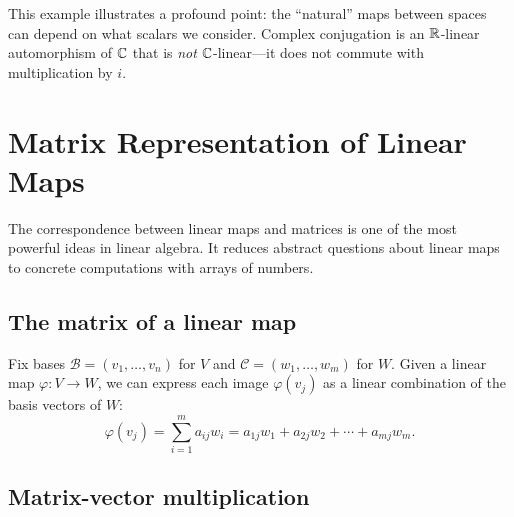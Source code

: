 \documentclass{report}
\begin{document}
This example illustrates a profound point: the ``natural'' maps between spaces can depend on what scalars we consider. Complex conjugation is an \(\RR\)-linear automorphism of \(\CC\) that is \emph{not} \(\CC\)-linear---it does not commute with multiplication by \(i\).



\section{Matrix Representation of Linear Maps}

The correspondence between linear maps and matrices is one of the most powerful ideas in linear algebra. It reduces abstract questions about linear maps to concrete computations with arrays of numbers.

\subsection{The matrix of a linear map}

Fix bases \(\mathcal{B} = (v_1, \ldots, v_n)\) for \(V\) and \(\mathcal{C} = (w_1, \ldots, w_m)\) for \(W\). Given a linear map \(\varphi : V \to W\), we can express each image \(\varphi(v_j)\) as a linear combination of the basis vectors of \(W\):
\[\varphi(v_j) = \sum_{i=1}^m a_{ij} w_i = a_{1j} w_1 + a_{2j} w_2 + \cdots + a_{mj} w_m.\]




\subsection{Matrix-vector multiplication}
\end{document}
